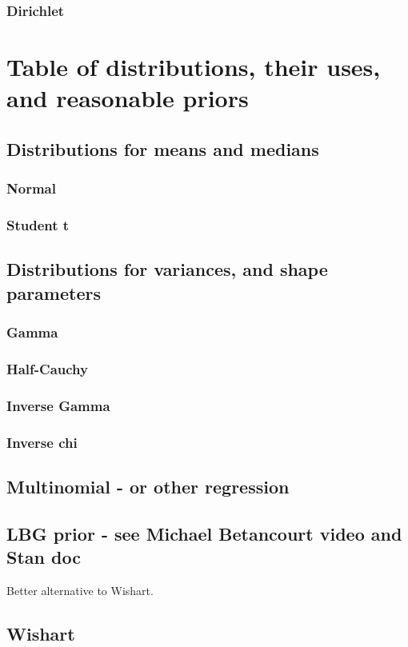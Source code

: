 \documentclass[11pt,fullpage]{book}
\begin{document}
\subsubsection{Dirichlet}

\section{Table of distributions, their uses, and reasonable priors}

\subsection{Distributions for means and medians}
\subsubsection{Normal}
\subsubsection{Student t}

\subsection{Distributions for variances, and shape parameters}
\subsubsection{Gamma}
\subsubsection{Half-Cauchy}
\subsubsection{Inverse Gamma}
\subsubsection{Inverse chi}
\subsection{Multinomial - or other regression}
\subsection{LBG prior - see Michael Betancourt video and Stan doc}
Better alternative to Wishart.
\subsection{Wishart}
\end{document}
